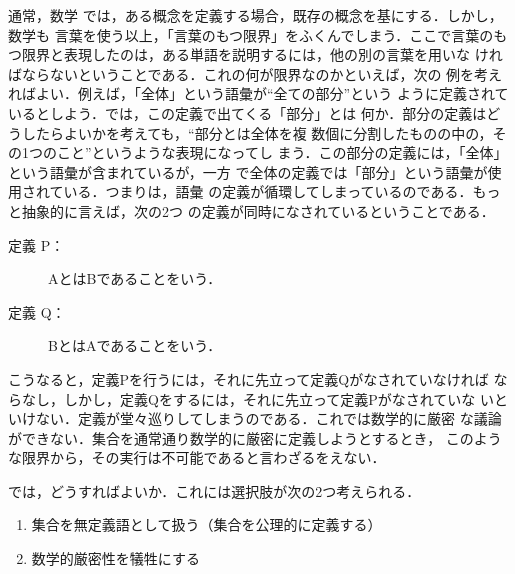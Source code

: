                 通常，数学
                では，ある概念を定義する場合，既存の概念を基にする．しかし，数学も
                言葉を使う以上，「言葉のもつ限界」をふくんでしまう．ここで言葉のも
                つ限界と表現したのは，ある単語を説明するには，他の別の言葉を用いな
                ければならないということである．これの何が限界なのかといえば，次の
                例を考えればよい．例えば，「全体」という語彙が“全ての部分”という
                ように定義されているとしよう．では，この定義で出てくる「部分」とは
                何か．部分の定義はどうしたらよいかを考えても，“部分とは全体を複
                数個に分割したものの中の，その1つのこと”というような表現になってし
                まう．この部分の定義には，「全体」という語彙が含まれているが，一方
                で全体の定義では「部分」という語彙が使用されている．つまりは，語彙
                の定義が循環してしまっているのである．もっと抽象的に言えば，次の2つ
                の定義が同時になされているということである．
                    \begin{description}
                        \item[\;\;\;定義 {\rm P}：\;]
                            AとはBであることをいう．
                        \item[\;\;\;定義 {\rm Q}：\;]
                            BとはAであることをいう．
                    \end{description}
                こうなると，定義Pを行うには，それに先立って定義Qがなされていなければ
                ならなし，しかし，定義Qをするには，それに先立って定義Pがなされていな
                いといけない．定義が堂々巡りしてしまうのである．これでは数学的に厳密
                な議論ができない．集合を通常通り数学的に厳密に定義しようとするとき，
                このような限界から，その実行は不可能であると言わざるをえない．

                では，どうすればよいか．これには選択肢が次の2つ考えられる．
                    \begin{enumerate}
                        \item 集合を無定義語として扱う（集合を公理的に定義する）
                        \item 数学的厳密性を犠牲にする
                    \end{enumerate}

